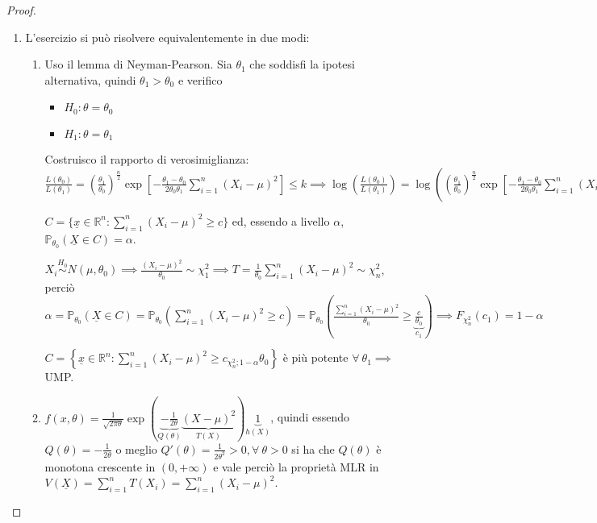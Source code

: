 \documentclass[hidelinks, 10pt]{report}
\begin{document}
\begin{proof}
\noindent
\begin{enumerate}
\item L'esercizio si pu\`o risolvere equivalentemente in due modi:
\begin{enumerate}
\item Uso il lemma di Neyman-Pearson. Sia $ \theta_{1} $ che soddisfi la ipotesi alternativa, quindi $ \theta_{1} > \theta_{0} $ e verifico
\begin{itemize}
\item $ H_{0}: \theta = \theta_{0} $
\item $ H_{1}: \theta = \theta_{1} $
\end{itemize}

Costruisco il rapporto di verosimiglianza: $ \frac{L(\theta_{0})}{L(\theta_{1})} = \left( \frac{\theta_{1}}{\theta_{0}} \right)^{\frac{n}{2}} \exp \left[ - \frac{\theta_{1} - \theta_{0}}{2 \theta_{0} \theta_{1}} \sum\limits_{i = 1}^{n} (X_{i} - \mu)^{2} \right] \le k \implies \log \left( \frac{L(\theta_{0})}{L(\theta_{1})} \right) =  \log \left( \left( \frac{\theta_{1}}{\theta_{0}} \right)^{\frac{n}{2}} \exp \left[ - \frac{\theta_{1} - \theta_{0}}{2 \theta_{0} \theta_{1}} \sum\limits_{i = 1}^{n} (X_{i} - \mu)^{2} \right] \right) \le \log k \implies \sum\limits_{i = 1}^{n} (X_{i} - \mu)^{2} \ge \frac{2 \theta_{0} \theta_{1}}{\theta_{1} - \theta_{0}} \left( \frac{n}{2} \log \frac{\theta_{1}}{\theta_{0}} - \log k \right) = c $

$ C = \{ \underline{x} \in \mathbb{R}^{n} : \sum\limits_{i = 1}^{n} (X_{i} - \mu)^{2} \ge c \} $ ed, essendo a livello $ \alpha $, $ \mathbb{P}_{\theta_{0}} (\underline{X} \in C) = \alpha $.

$ X_{i} \stackrel{H_{0}}{\sim} N(\mu, \theta_{0}) \implies \frac{(X_{i} - \mu)^{2}}{\theta_{0}} \sim \chi^{2}_{1} \implies T = \frac{1}{\theta_{0}} \sum\limits_{i = 1}^{n} (X_{i} - \mu)^{2} \sim \chi^{2}_{n} $, perci\`o $ \alpha = \mathbb{P}_{\theta_{0}} (\underline{X} \in C) = \mathbb{P}_{\theta_{0}} \left( \sum\limits_{i = 1}^{n} (X_{i} - \mu)^{2} \ge c \right) = \mathbb{P}_{\theta_{0}} \left( \frac{\sum\limits_{i = 1}^{n} (X_{i} - \mu)^{2}}{\theta_{0}} \ge \underbrace{\frac{c}{\theta_{0}}}_{c_{1}} \right) \implies F_{\chi^{2}_{n}} (c_{1}) = 1 - \alpha $

$ C = \left\{ \underline{x} \in \mathbb{R}^{n} : \sum\limits_{i = 1}^{n} (X_{i} - \mu)^{2} \ge c_{\chi^{2}_{n}; 1 - \alpha} \theta_{0} \right\} $ \`e pi\`u potente $ \forall\ \theta_{1} \implies $ UMP.
\item $ f(x, \theta) = \frac{1}{\sqrt{2 \pi \theta}} \exp \left( \underbrace{- \frac{1}{2 \theta}}_{Q(\theta)} \underbrace{(X - \mu)^{2}}_{T(X)} \right) \underbrace{1}_{h(X)} $, quindi essendo $ Q(\theta) = - \frac{1}{2 \theta} $ o meglio $ Q'(\theta) = \frac{1}{2 \theta^{2}} > 0, \forall\ \theta > 0 $ si ha che $ Q(\theta) $ \`e monotona crescente in $ (0, +\infty) $ e vale perci\`o la propriet\`a MLR in $ V(\underline{X}) = \sum\limits_{i = 1}^{n} T(X_{i}) = \sum\limits_{i = 1}^{n} (X_{i} - \mu)^{2} $.


\end{enumerate}
\end{enumerate}
\end{proof}
\end{document}
